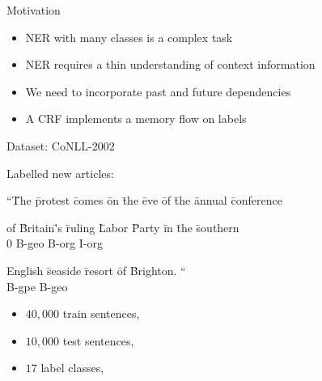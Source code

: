 \documentclass[final]{beamer}
\newlength{\onecolwid}
\begin{document}
\begin{frame}[t]
\begin{columns}[t]
\begin{column}{\onecolwid}
\begin{block}{Motivation}
    \begin{itemize}
      \item NER with many classes is a complex task
      \item NER requires a thin understanding of context information
      \item We need to incorporate past and future dependencies
      \item A CRF implements a memory flow on labels
    \end{itemize}

\end{block}

\begin{block}{Dataset: CoNLL-2002}

Labelled new articles:

\vspace{5mm}

\begin{tabbing}
``\=The \=protest \=comes \=on \=the \=eve \=of \=the \=annual \=conference \\
         
\end{tabbing}

\vspace{5mm}

\begin{tabbing}
of \=Britain\='s \=ruling \=Labor \=Party \=in \=the \=southern \\

0 \>B-geo   \>B-org \>I-org   
\end{tabbing}

\vspace{5mm}

\begin{tabbing}
English \=seaside \=resort \=of \=Brighton. `` \\

B-gpe    \>B-geo
\end{tabbing}

\vspace{10mm}


\begin{itemize}
  \item $40,000$ train sentences,

  \item $10,000$ test sentences,

  \item $17$ label classes,


\end{itemize}
\end{block}
\end{column}
\end{columns}
\end{frame}
\end{document}
